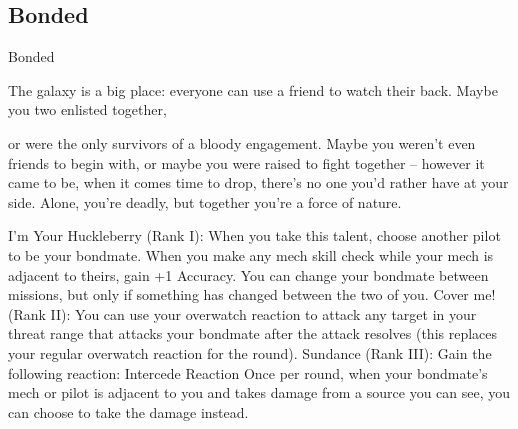 \subsection{Bonded}


                                                     Bonded  

The galaxy is a big place: everyone can use a friend to watch their back. Maybe you two enlisted together,  

or were the only survivors of a bloody engagement. Maybe you weren’t even friends to begin with, or  
maybe you were raised to fight together  -- however it came to be, when it comes time to drop, there’s no  
one you’d rather have at your side. Alone, you’re deadly, but together you’re a force of nature.    

I’m Your Huckleberry (Rank I): When you take this talent, choose another pilot to be your  
bondmate. When you make any mech skill check while your mech is adjacent to theirs, gain +1  
Accuracy. You can change your bondmate between missions, but only if something has changed  
between the two of you.  
Cover me! (Rank II): You can use your overwatch reaction to attack any target in your threat  
range that attacks your bondmate after the attack resolves (this replaces your regular overwatch  
reaction for the round).  
Sundance (Rank III): Gain the following reaction:  
         Intercede  
         Reaction  
         Once per round, when your bondmate’s mech or pilot is adjacent to you and takes  
         damage from a source you can see, you can choose to take the damage instead.  